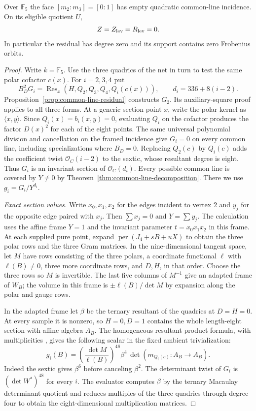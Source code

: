 \begin{theorem}
\label{thm:fixed-face-quadratic-empty}
Over \(\mathbb F_5\) the face \([m_2:m_3]=[0:1]\) has empty
quadratic common-line incidence. On its eligible quotient \(U\),
\[
             Z=Z_{\rm lev}=R_{\rm lev}=0 .
\]
In particular the residual has degree zero and its support contains
zero Frobenius orbits.
\end{theorem}

\begin{proof}
Write \(k=\mathbb F_5\). Use the three quadrics of the net in turn
to test the same polar cofactor \(c(x)\). For \(i=2,3,4\) put
\[
  B_D^2 G_i=\operatorname{Res}_x(H,Q_2,Q_3,Q_4,Q_i(c(x))),
  \qquad d_i=336+8(i-2).
\]
Proposition~\ref{prop:common-line-residual} constructs \(G_2\).
Its auxiliary-square proof applies to all three forms. At a generic
section point \(x\), write the polar kernel as \(\langle x,y\rangle\).
Since \(Q_i(x)=b_i(x,y)=0\), evaluating \(Q_i\) on the cofactor
produces the factor \(D(x)^2\) for each of the eight points. The same
universal polynomial division and cancellation on the framed incidence
give \(G_i=0\) on every common line, including specializations where
\(B_D=0\). Replacing \(Q_2(c)\) by \(Q_i(c)\) adds the coefficient
twist \(\mathcal O_C(i-2)\) to the sextic, whose resultant degree is
eight. Thus \(G_i\) is an invariant section of \(\mathcal O_C(d_i)\).
Every possible common line is covered by \(Y\ne0\) by
Theorem~\ref{thm:common-line-decomposition}. There we use
\(g_i=G_i/Y^{d_i}\).

\emph{Exact section values.}
Write \(x_0,x_1,x_2\) for the edges incident to vertex 2 and \(y_j\)
for the opposite edge paired with \(x_j\). Then \(\sum x_j=0\) and
\(Y=\sum y_j\). The calculation uses the affine frame \(Y=1\)
and the invariant parameter \(t=x_0x_1x_2\) in this frame.
At each supplied pure point, expand
\(\operatorname{per}(J_4+sB+uX)\) to obtain the three polar rows
and the three Gram matrices. In the nine-dimensional tangent space,
let \(M\) have rows consisting of the three polars, a coordinate
functional \(\ell\) with \(\ell(B)\ne0\), three more coordinate rows,
and \(D,H\), in that order. Choose the three rows so \(M\) is
invertible. The last five columns of \(M^{-1}\) give an adapted
frame of \(W_B\); the volume in this frame is
\(\pm\ell(B)/\det M\) by expansion along the polar and gauge rows.

In the adapted frame let \(\beta\) be the ternary resultant of the
quadrics at \(D=H=0\). At every sample it is nonzero, so \(H=0,D=1\)
contains the whole length-eight section with affine algebra \(A_B\).
The homogeneous resultant product formula, with multiplicities
\cite{jouanolouResultant},
gives the following scalar in the fixed ambient trivialization:
\[
   g_i(B)=\left(\frac{\det M}{\ell(B)}\right)^{48}
             \beta^4\,\det\!\left(m_{Q_i(c)}:A_B\to A_B\right).
\]
Indeed the sextic gives \(\beta^6\) before canceling \(\beta^2\).
The determinant twist of \(G_i\) is \((\det W^*)^{48}\) for every
\(i\). The evaluator computes \(\beta\) by the ternary Macaulay
determinant quotient and reduces multiples of the three quadrics
through degree four to obtain the eight-dimensional multiplication
matrices.


\end{proof}
